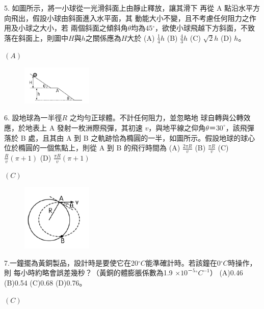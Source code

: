 \documentclass[cn,10pt,math=newtx,chinesefont=founder,device=ig]{elegantbook}
\begin{document}
\begin{example}
   5. 如圖所示，將一小球從一光滑斜面上由靜止釋放，讓其滑下
再從 A 點沿水平方向飛出，假設小球由斜面進入水平面，其
動能大小不變，且不考慮任何阻力之作用及小球之大小，若
兩個斜面之傾斜角$\theta$均為45$^\circ$，欲使小球飛越下方斜面，不致
落在斜面上，則圖中$H$與$h$之關係應為$H$大於 
(A) $\frac{1}{4} h$          (B) $\frac{4}{3} h$         (C) $\sqrt{2}h$        (D) $h$。\\
    \rightline{[全國聯招教甄109]}
\end{example}
\begin{solution}
    $(A)$
\end{solution}
\begin{figure}[htbp]
    \flushright
    \includegraphics[width=0.3\textwidth]{image/109全國5.png}
  \end{figure}
\newpage

\begin{example}
   6. 設地球為一半徑$R$ 之均勻正球體。不計任何阻力，並忽略地
球自轉與公轉效應，於地表上 A 發射一枚洲際飛彈，其初速
$v$，與地平線之仰角$\theta＝30 ^\circ$，該飛彈落於 B 處，且其由 A 到
B 之軌跡恰為橢圓的一半，如圖所示。假設地球的球心位於橢圓的一個焦點上，則從 A 到 B 的飛行時間為
(A) $\frac{2\pi R}{v}$  (B) $\frac{\pi R}{v}$  (C) $\frac{ R}{v}(\pi+1)$  (D) $\frac{\pi  R}{v}(\pi+1)$
\\
    \rightline{[全國聯招教甄109]}
\end{example}
\begin{solution}
    $(C)$
\end{solution}
\begin{figure}[htbp]
    \flushright
    \includegraphics[width=0.3\textwidth]{image/109全國6.png}
  \end{figure}
\newpage


\begin{example}
7.一鐘擺為黃銅製品，設計時是要使它在20$^\circ C$能準確計時。若該鐘在0$^\circ C$時操作，則
每小時約略會誤差幾秒？（黃銅的體膨脹係數為1.9 $\times 10^{－5}  {^\circ}C^{-1}$） (A)0.46  
(B)0.54  (C)0.68  (D)0.76。\\
  
    \rightline{[全國聯招教甄109]}
\end{example}
\begin{solution}
    $(C)$
\end{solution}
\end{document}
